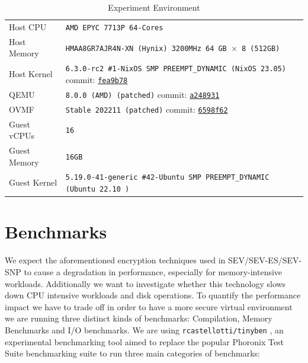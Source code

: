 \documentclass[twocolumn]{article}
\begin{document}
\begin{table}[ht]
    \small
    \centering
    \begin{tabular}{l|l}
        \hline
        Host CPU      & \texttt{AMD EPYC 7713P 64-Cores}                                            \\
        Host Memory   & \texttt{HMAA8GR7AJR4N-XN (Hynix) 3200MHz 64 GB $\times$ 8 (512GB)}          \\
        Host Kernel   & \texttt{6.3.0-rc2 \#1-NixOS SMP PREEMPT\_DYNAMIC (NixOS 23.05)} commit: \href{https://github.com/AMDESE/linux/tree/fea9b785bfa90e015c7d81526e36060da1bf01d1}{\texttt{fea9b78}}            \\
        QEMU          & \texttt{8.0.0 (AMD) (patched)} commit: \href{https://github.com/AMDESE/qemu/tree/a248931547843b9edb0f3b0c7d6d0c76ffdf7659}{\texttt{a248931}}                                             \\
        OVMF          & \texttt{Stable 202211 (patched)} commit: \href{https://github.com/AMDESE/ovmf/commit/6598f62bda4eb884c65d6c0aed7ede64258a41d8}{\texttt{6598f62}}                                     \\
        Guest vCPUs   & \texttt{16}                                                                 \\
        Guest Memory  & \texttt{16GB}                                                               \\
        Guest Kernel  & \texttt{5.19.0-41-generic \#42-Ubuntu SMP PREEMPT\_DYNAMIC (Ubuntu 22.10 )} \\ 
        \hline
    \end{tabular}
    \caption{Experiment Environment}
    \label{tab:experiment-environment}
\end{table}

\section{Benchmarks}
We expect the aforementioned encryption techniques used in SEV/SEV-ES/SEV-SNP to cause a degradation in performance, especially for memory-intensive workloads. Additionally we want to investigate whether this technology slows down CPU intensive workloads and disk operations. To quantify the performance impact we have to trade off in order to have a more secure virtual environment we are running three distinct kinds of benchmarks: Compilation, Memory Benchmarks and I/O benchmarks. We are using \texttt{rcastellotti/tinyben} \cite{tinyben}, an experimental benchmarking tool aimed to replace the popular Phoronix Test Suite \cite{pts} benchmarking suite to run three main categories of benchmarks:
\end{document}
